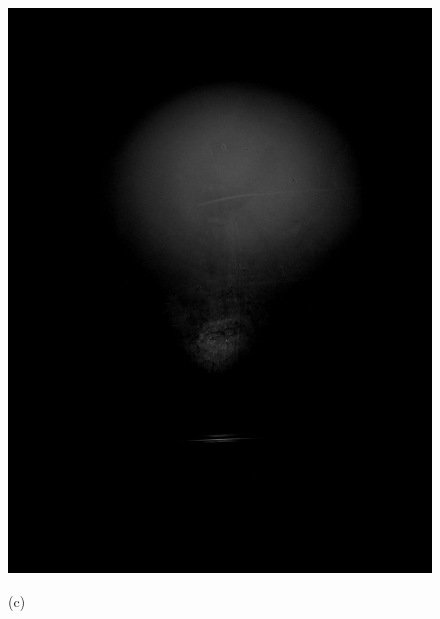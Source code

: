 \begin{figure}[!htbp]
\begin{minipage}{0.3\linewidth}
                \centerline{\includegraphics[width=\textwidth]{FIG/fig9(c).png}}
                \centerline{(c)}
              \end{minipage}
              \begin{minipage}{0.3\linewidth}
                \centering

\end{minipage}
\end{figure}

